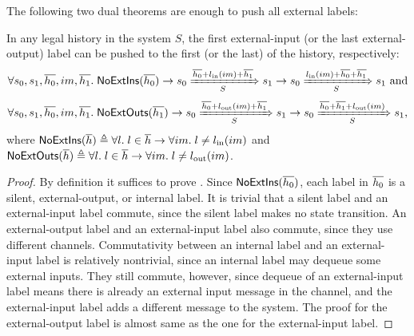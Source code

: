 The following two dual theorems are enough to push all external labels:
\begin{theorem}
  \label{thm-push-ext-labels}
  In any legal history in the system $S$, the first external-input (or the last external-output) label can be pushed to the first (or the last) of the history, respectively:
  \begin{displaymath}
    \forall s_0, s_1, \listof{h_0}, im, \listof{h_1}.\;
    \mathsf{NoExtIns}(\listof{h_0}) \to
    \semsteps{S}{s_0}{\listapp{\listcons{\listof{h_0}}{\lblIns{im}}}{\listof{h_1}}}{s_1} \to
    \semsteps{S}{s_0}{\listapp{\lblIns{im}}{\listapp{\listof{h_0}}{\listof{h_1}}}}{s_1}\ \textrm{and}
  \end{displaymath}
  \begin{displaymath}
    \forall s_0, s_1, \listof{h_0}, im, \listof{h_1}.\;
    \mathsf{NoExtOuts}(\listof{h_1}) \to
    \semsteps{S}{s_0}{\listapp{\listcons{\listof{h_0}}{\lblOuts{im}}}{\listof{h_1}}}{s_1} \to
    \semsteps{S}{s_0}{\listapp{\listapp{\listof{h_0}}{\listof{h_1}}}{\lblOuts{im}}}{s_1},
  \end{displaymath}
  where $\mathsf{NoExtIns}(\listof{h}) \triangleq \forall l.\; l \in \listof{h} \to \forall im.\; l \neq \lblIns{im}$ and
  $\mathsf{NoExtOuts}(\listof{h}) \triangleq \forall l.\; l \in \listof{h} \to \forall im.\; l \neq \lblOuts{im}$.
\end{theorem}
\begin{proof}
  By definition it suffices to prove .
  Since $\mathsf{NoExtIns}(\listof{h_0})$, each label in $\listof{h_0}$ is a silent, external-output, or internal label.
  It is trivial that a silent label and an external-input label commute, since the silent label makes no state transition.
  An external-output label and an external-input label also commute, since they use different channels.
  Commutativity between an internal label and an external-input label is relatively nontrivial, since an internal label may dequeue some external inputs.
  They still commute, however, since dequeue of an external-input label means there is already an external input message in the channel, and the external-input label adds a different message to the system.
  The proof for the external-output label is almost same as the one for the external-input label.
\end{proof}

